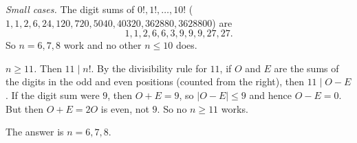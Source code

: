 \emph{Small cases.} The digit sums of $0!,1!,\dots,10!$ ($1,1,2,6,24,120,720,5040,40320,362880,3628800$) are
\[1,1,2,6,6,3,9,9,9,27,27.\]
So $n=6,7,8$ work and no other $n\le10$ does.

\emph{$n\ge11$.} Then $11\mid n!$. By the divisibility rule for $11$, if $O$ and $E$ are the sums of the digits in the odd and even positions (counted from the right), then $11\mid O-E$. If the digit sum were $9$, then $O+E=9$, so $|O-E|\le9$ and hence $O-E=0$. But then $O+E=2O$ is even, not $9$. So no $n\ge11$ works.

The answer is $\boxed{n=6,7,8}$.
